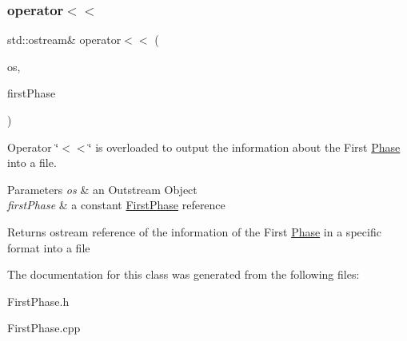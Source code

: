 \subsubsection{\texorpdfstring{operator$<$$<$}{operator<<}}
{\footnotesize\ttfamily std\+::ostream\& operator$<$$<$ (\begin{DoxyParamCaption}\item[{std\+::ostream \&}]{os,  }\item[{const \hyperlink{class_first_phase}{First\+Phase} \&}]{first\+Phase }\end{DoxyParamCaption})\hspace{0.3cm}{\ttfamily [friend]}}



Operator \char`\"{}$<$$<$\char`\"{} is overloaded to output the information about the First \hyperlink{class_phase}{Phase} into a file. 


\begin{DoxyParams}{Parameters}
{\em os} & an Outstream Object \\
\hline
{\em first\+Phase} & a constant \hyperlink{class_first_phase}{First\+Phase} reference \\
\hline
\end{DoxyParams}
\begin{DoxyReturn}{Returns}
ostream reference of the information of the First \hyperlink{class_phase}{Phase} in a specific format into a file 
\end{DoxyReturn}


The documentation for this class was generated from the following files\+:\begin{DoxyCompactItemize}
\item 
First\+Phase.\+h\item 
First\+Phase.\+cpp\end{DoxyCompactItemize}
